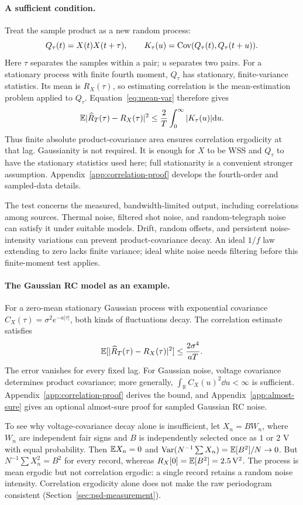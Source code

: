 \paragraph{A sufficient condition.}
Treat the sample product as a new random process:
\[
Q_\tau(t)=X(t)X(t+\tau),\qquad
K_\tau(u)=\operatorname{Cov}(Q_\tau(t),Q_\tau(t+u)).
\]
Here $\tau$ separates the samples within a pair; $u$ separates two pairs. For a stationary process with finite fourth moment, $Q_\tau$ has stationary, finite-variance statistics. Its mean is $R_X(\tau)$, so estimating correlation is the mean-estimation problem applied to $Q_\tau$. Equation~\eqref{eq:mean-var} therefore gives
\[
\mathbb E|\widehat R_T(\tau)-R_X(\tau)|^2
\leq\frac2T\int_0^\infty|K_\tau(u)|\mathrm d u.
\]
Thus finite absolute product-covariance area ensures correlation ergodicity at that lag. Gaussianity is not required. It is enough for $X$ to be WSS and $Q_\tau$ to have the stationary statistics used here; full stationarity is a convenient stronger assumption. Appendix~\ref{app:correlation-proof} develops the fourth-order and sampled-data details.

The test concerns the measured, bandwidth-limited output, including correlations among sources. Thermal noise, filtered shot noise, and random-telegraph noise can satisfy it under suitable models. Drift, random offsets, and persistent noise-intensity variations can prevent product-covariance decay. An ideal $1/f$ law extending to zero lacks finite variance; ideal white noise needs filtering before this finite-moment test applies.

\paragraph{The Gaussian RC model as an example.}
For a zero-mean stationary Gaussian process with exponential covariance
$C_X(\tau)=\sigma^2e^{-a|\tau|}$, both kinds of fluctuations decay. The correlation estimate satisfies
\[
\mathbb E[|\widehat R_T(\tau)-R_X(\tau)|^2]\leq\frac{2\sigma^4}{aT}.
\]
The error vanishes for every fixed lag. For Gaussian noise, voltage covariance determines product covariance; more generally, $\int_{\mathbb R}C_X(u)^2\dd u<\infty$ is sufficient. Appendix~\ref{app:correlation-proof} derives the bound, and Appendix~\ref{app:almost-sure} gives an optional almost-sure proof for sampled Gaussian RC noise.

To see why voltage-covariance decay alone is insufficient, let $X_n=B W_n$, where $W_n$ are independent fair signs and $B$ is independently selected once as $1$ or $2$ V with equal probability. Then $\mathbb E X_n=0$ and
$\operatorname{Var}(N^{-1}\sum X_n)=\mathbb E[B^2]/N\to0$.
But $N^{-1}\sum X_n^2=B^2$ for every record, whereas $R_X[0]=\mathbb E[B^2]=2.5\,\mathrm{V}^2$. The process is mean ergodic but not correlation ergodic: a single record retains a random noise intensity. Correlation ergodicity alone does not make the raw periodogram consistent (Section~\ref{sec:psd-measurement}).


